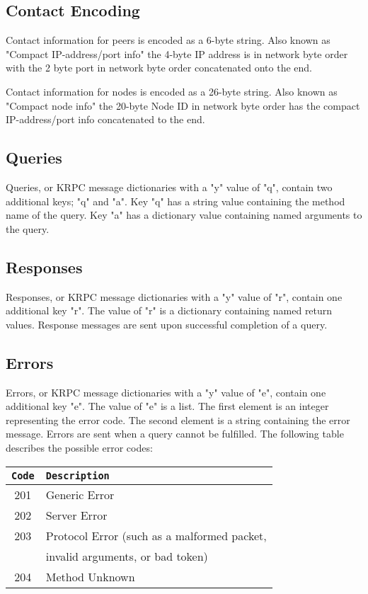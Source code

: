 \documentclass{article}
\begin{document}
{\subsection {Contact Encoding}}

Contact information for peers is encoded as a 6-byte string. Also known as "Compact IP-address/port info" the 4-byte IP address is in network byte order with the 2 byte port in network byte order concatenated onto the end.

Contact information for nodes is encoded as a 26-byte string. Also known as "Compact node info" the 20-byte Node ID in network byte order has the compact IP-address/port info concatenated to the end.

{\subsection {Queries}}

Queries, or KRPC message dictionaries with a "y" value of "q", contain two additional keys; "q" and "a". Key "q" has a string value containing the method name of the query. Key "a" has a dictionary value containing named arguments to the query.

{\subsection {Responses}}

Responses, or KRPC message dictionaries with a "y" value of "r", contain one additional key "r". The value of "r" is a dictionary containing named return values. Response messages are sent upon successful completion of a query.

{\subsection {Errors}}
Errors, or KRPC message dictionaries with a "y" value of "e", contain one additional key "e". The value of "e" is a list. The first element is an integer representing the error code. The second element is a string containing the error message. Errors are sent when a query cannot be fulfilled. The following table describes the possible error codes:

\begin{tabular}{|c|l|}
\hline
{\tt Code} & {\tt Description} \\
\hline
201 & Generic Error \\
202 & Server Error \\
203 & Protocol Error (such as a malformed packet,\\
    & invalid arguments, or bad token) \\
204 & Method Unknown \\
\hline
\end{tabular}
\end{document}
